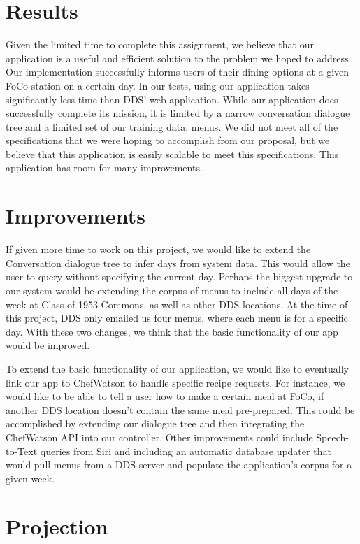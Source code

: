\documentclass [12pt] {article}
\begin{document}
 \section{Results}

 Given the limited time to complete this assignment, we believe that our application is a useful and efficient solution to the problem we hoped to address. Our implementation successfully informs users of their dining options at a given FoCo station on a certain day. In our tests, using our application takes significantly less time than DDS' web application. While our application does successfully complete its mission, it is limited by a narrow conversation dialogue tree and a limited set of our training data: menus. We did not meet all of the specifications that we were hoping to accomplish from our proposal, but we believe that this application is easily scalable to meet this specifications. This application has room for many improvements.

 \section{Improvements}

 If given more time to work on this project, we would like to extend the Conversation dialogue tree to infer days from system data. This would allow the user to query without specifying the current day. Perhaps the biggest upgrade to our system would be extending the corpus of menus to include all days of the week at Class of 1953 Commons, as well as other DDS locations. At the time of this project, DDS only emailed us four menus, where each menu is for a specific day. With these two changes, we think that the basic functionality of our app would be improved.

 To extend the basic functionality of our application, we would like to eventually link our app to ChefWatson to handle specific recipe requests. For instance, we would like to be able to tell a user how to make a certain meal at FoCo, if another DDS location doesn't contain the same meal pre-prepared. This could be accomplished by extending our dialogue tree and then integrating the ChefWatson API into our controller. Other improvements could include Speech-to-Text queries from Siri and including an automatic database updater that would pull menus from a DDS server and populate the application's corpus for a given week.

\section{Projection}
\end{document}
